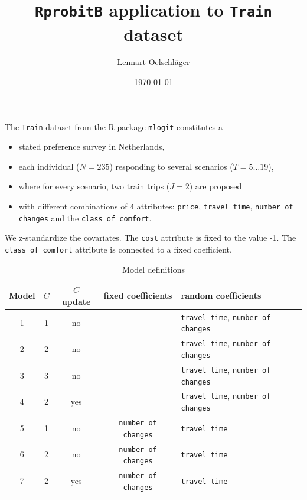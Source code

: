 \documentclass[10pt,a4paper]{article}
\begin{document}
	\title{\texttt{RprobitB} application to \texttt{Train} dataset}
	\author{Lennart Oelschläger}
	\date{\today}
	\maketitle
	The \texttt{Train} dataset from the R-package \texttt{mlogit} constitutes a
	\begin{itemize}
		\item stated preference survey in Netherlands,
		\item each individual ($N = 235$) responding to several scenarios ($T = 5\dots19$),
		\item where for every scenario, two train trips ($J = 2$) are proposed 
		\item with different combinations of 4 attributes: \texttt{price}, \texttt{travel time}, \texttt{number of changes} and the \texttt{class of comfort}.
	\end{itemize}
	We z-standardize the covariates.
	The \texttt{cost} attribute is fixed to the value -1. The \texttt{class of comfort} attribute is connected to a fixed coefficient.
	\begin{table}[h]
		\centering
		\begin{tabular}{c|c|c|c|l}
			Model & $C$ & $C$ update & fixed coefficients & random coefficients \\ \hline
			1	  &  1  &  no  &  & \texttt{travel time}, \texttt{number of changes} \\ \hline
			2  	  &  2  &  no  &  & \texttt{travel time}, \texttt{number of changes} \\ \hline
			3	  &  3  &  no  &  & \texttt{travel time}, \texttt{number of changes} \\ \hline
			4	  &  2  &  yes &  & \texttt{travel time}, \texttt{number of changes} \\ \hline
			5     &  1  &  no  & \texttt{number of changes} & \texttt{travel time} \\ \hline
			6     &  2  &  no  & \texttt{number of changes} & \texttt{travel time} \\ \hline
			7     &  2  &  yes & \texttt{number of changes} & \texttt{travel time} \\ 
		\end{tabular}
		\caption{Model definitions}
	\end{table}
\end{document}
